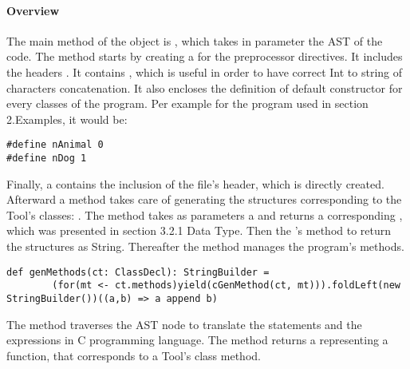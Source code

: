 \paragraph{Overview}
The main method of the object
\newline
\lstset{style=customc}{\lstinline[basicstyle=\small\ttfamily]|COutputGeneration|} is
\lstset{style=customc}{\lstinline[basicstyle=\small\ttfamily]|def run(ctx: Context)(prog: Program)|}, which takes
in parameter the AST of the code. %
\newline
The method starts by creating a \lstset{style=customc}{\lstinline[basicstyle=\small\ttfamily]|StringBuilders|} for the preprocessor directives.
It includes the headers \lstset{style=customc}{\lstinline[basicstyle=\small\ttfamily]|stdio.h, string.h and stdlib.h|}.
It contains \lstset{style=customc}{\lstinline[basicstyle=\small\ttfamily]|#define INT_MAX_LENGTH 12|}, which is useful
in order to have correct Int to string of characters concatenation.
It also encloses the definition of default constructor for every classes of the program.
Per example for the program used in section 2.Examples, it would be:
\begin{lstlisting}
#define nAnimal 0
#define nDog 1
\end{lstlisting}
Finally, a \lstset{style=customc}{\lstinline[basicstyle=\small\ttfamily]|StringBuilder|} contains the inclusion of the file's header,
which is directly created.
\newline
Afterward a method takes care of generating the structures corresponding to the Tool's classes:
\newline
\lstset{style=customc}{\lstinline[basicstyle=\small\ttfamily]|def genStructDef(ct: ClassDecl): StructDef|}.
The method takes as parameters a \lstset{style=customc}{\lstinline[basicstyle=\small\ttfamily]|ClassDecl|}
and returns a corresponding \lstset{style=customc}{\lstinline[basicstyle=\small\ttfamily]|StructDef|},
which was presented in section 3.2.1 Data Type. Then the \lstset{style=customc}{\lstinline[basicstyle=\small\ttfamily]|StructDef|}'s method
\lstset{style=customc}{\lstinline[basicstyle=\small\ttfamily]|toStringRepr|} to return the structures as String.
\newline
Thereafter the method manages the program's methods.
\begin{lstlisting}
def genMethods(ct: ClassDecl): StringBuilder =
        (for(mt <- ct.methods)yield(cGenMethod(ct, mt))).foldLeft(new StringBuilder())((a,b) => a append b)
\end{lstlisting}
The method \lstset{style=customc}{\lstinline[basicstyle=\small\ttfamily]|cGenMethod|} traverses the AST node
\lstset{style=customc}{\lstinline[basicstyle=\small\ttfamily]|MethodDecl|} to translate the statements and the expressions
in C programming language. The method returns a \lstset{style=customc}{\lstinline[basicstyle=\small\ttfamily]|StringBuilder|}
representing a function, that corresponds to a Tool's class method.
\newline

